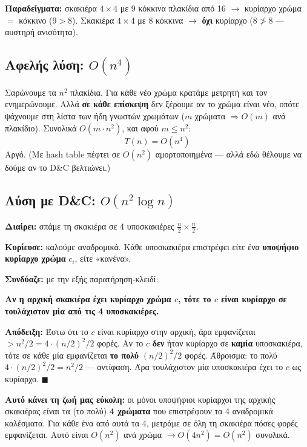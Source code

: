 \documentclass[11pt,a4paper]{article}
\begin{document}
\textbf{Παραδείγματα:} σκακιέρα $4 \times 4$ με 9 κόκκινα πλακίδια από 16 $\to$
κυρίαρχο χρώμα $=$ κόκκινο ($9 > 8$). Σκακιέρα $4 \times 4$ με 8 κόκκινα $\to$
\textbf{όχι} κυρίαρχο ($8 \not> 8$ --- αυστηρή ανισότητα).

\subsection{Αφελής λύση: $O(n^4)$}

Σαρώνουμε τα $n^2$ πλακίδια. Για κάθε νέο χρώμα κρατάμε μετρητή και τον
ενημερώνουμε. Αλλά \textbf{σε κάθε επίσκεψη} δεν ξέρουμε αν το χρώμα είναι νέο,
οπότε ψάχνουμε στη λίστα των ήδη γνωστών χρωμάτων ($m$ χρώματα $\Rightarrow O(m)$
ανά πλακίδιο). Συνολικά $O(m \cdot n^2)$, και αφού $m \le n^2$:
\[
T(n) = O(n^4)
\]
Αργό. (Με hash table πέφτει σε $O(n^2)$ αμορτοποιημένα --- αλλά εδώ θέλουμε να
δούμε αν το D\&C βελτιώνει.)

\subsection{Λύση με D\&C: $O(n^2 \log n)$}

\textbf{Διαίρει:} σπάμε τη σκακιέρα σε 4 υποσκακιέρες $\frac{n}{2} \times
\frac{n}{2}$.

\textbf{Κυρίευσε:} καλούμε αναδρομικά. Κάθε υποσκακιέρα επιστρέφει είτε ένα
\textbf{υποψήφιο κυρίαρχο χρώμα} $c_i$, είτε «κανένα».

\textbf{Συνδύαζε:} με την εξής παρατήρηση-κλειδί:

\begin{keypoint}
\textbf{Αν η αρχική σκακιέρα έχει κυρίαρχο χρώμα $c$, τότε το $c$ είναι κυρίαρχο
σε τουλάχιστον μία από τις 4 υποσκακιέρες.}

\textbf{Απόδειξη:} Έστω ότι το $c$ είναι κυρίαρχο στην αρχική, άρα εμφανίζεται
$> n^2/2 = 4 \cdot (n/2)^2 / 2$ φορές. Αν το $c$ \textbf{δεν} ήταν κυρίαρχο σε
\textbf{καμία} υποσκακιέρα, τότε σε κάθε μία εμφανίζεται \textbf{το πολύ}
$(n/2)^2 / 2$ φορές. Άθροισμα: το πολύ $4 \cdot (n/2)^2 / 2 = n^2/2$ ---
αντίφαση. Άρα τουλάχιστον μία υποσκακιέρα έχει το $c$ ως κυρίαρχο.
$\blacksquare$
\end{keypoint}

\textbf{Αυτό κάνει τη ζωή μας εύκολη:} οι μόνοι υποψήφιοι κυρίαρχοι της αρχικής
σκακιέρας είναι τα (το πολύ) \textbf{4 χρώματα} που επιστρέφουν τα 4 αναδρομικά
καλέσματα. Για κάθε ένα από αυτά τα 4, μετράμε σε όλη τη σκακιέρα πόσες φορές
εμφανίζεται. Αυτό είναι $O(n^2)$ ανά χρώμα $\to O(4 n^2) = O(n^2)$ συνολικά.
\end{document}
